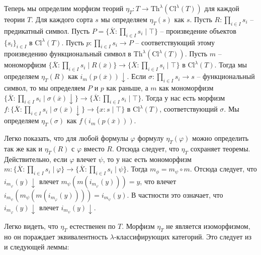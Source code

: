 \documentclass[reqno]{amsart}
\theoremstyle{definition}
\theoremstyle{remark}
\newcommand{\fs}[1]{\mathrm{#1}}
\begin{document}
Теперь мы определим морфизм теорий $\eta_T : T \to \fs{Th}^\lambda(\fs{Cl}^\lambda(T))$ для каждой теории $T$.
Для каждого сорта $s$ мы определяем $\eta_T(s)$ как $s$.
Пусть $R : \prod_{i \in I} s_i$ -- предикатный символ.
Пусть $P = \{ \overline{X} : \prod_{i \in I} s_i \mid \top \}$ -- произведение объектов $\{ s_i \}_{i \in I}$ в $\fs{Cl}^\lambda(T)$.
Пусть $p : \prod_{i \in I} s_i \to P$ -- соответствующий этому произведению функциональный символ в $\fs{Th}^\lambda(\fs{Cl}^\lambda(T))$.
Пусть $m$ -- мономорфизм $\{ \overline{X} : \prod_{i \in I} s_i \mid R(\overline{x}) \} \to \{ \overline{X} : \prod_{i \in I} s_i \mid \top \}$ в $\fs{Cl}^\lambda(T)$.
Тогда мы определяем $\eta_T(R)$ как $i_m(p(\overline{x}))\!\downarrow$.
Если $\sigma : \prod_{i \in I} s_i \to s$ -- функциональный символ, то мы определяем $P$ и $p$ как раньше,
а $m$ как мономорфизм $\{ \overline{X} : \prod_{i \in I} s_i \mid \sigma(\overline{x})\!\downarrow \} \to \{ \overline{X} : \prod_{i \in I} s_i \mid \top \}$.
Тогда у нас есть морфизм $f : \{ \overline{X} : \prod_{i \in I} s_i \mid \sigma(\overline{x})\!\downarrow \} \to \{ x : s \mid \top \}$ в $\fs{Cl}^\lambda(T)$, соответствующий $\sigma$.
Мы определяем $\eta_T(\sigma)$ как $f(i_m(p(\overline{x})))$.

Легко показать, что для любой формулы $\varphi$ формулу $\eta_T(\varphi)$ можно определить так же как и $\eta_T(R)$ с $\varphi$ вместо $R$.
Отсюда следует, что $\eta_T$ сохраняет теоремы.
Действительно, если $\varphi$ влечет $\psi$, то у нас есть мономорфизм $m : \{ \overline{X} : \prod_{i \in I} s_i \mid \varphi \} \to \{ \overline{X} : \prod_{i \in I} s_i \mid \psi \}$.
Тогда $m_\phi = m_\psi \circ m$.
Отсюда следует, что $i_{m_\varphi}(y)\!\downarrow$ влечет $m_\psi(m(i_{m_\varphi}(y))) = y$, что влечет $i_{m_\psi}(m_\psi(m(i_{m_\varphi}(y)))) = i_{m_\psi}(y)$.
В частности это означает, что $i_{m_\varphi}(y)\!\downarrow$ влечет $i_{m_\psi}(y)\!\downarrow$.

Легко видеть, что $\eta_T$ естественен по $T$.
Морфизм $\eta_T$ не является изоморфизмом, но он пораждает эквивалентность $\lambda$-классифирующих категорий.
Это следует из  и следующей леммы:
\end{document}
